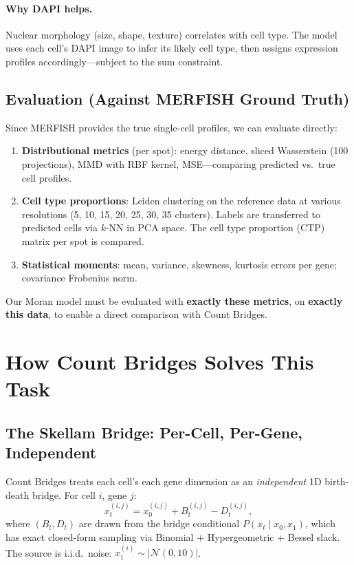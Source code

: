 \documentclass[11pt]{article}
\begin{document}
\paragraph{Why DAPI helps.} Nuclear morphology (size, shape, texture) correlates with cell type. The model uses each cell's DAPI image to infer its likely cell type, then assigns expression profiles accordingly---subject to the sum constraint.

\subsection{Evaluation (Against MERFISH Ground Truth)}

Since MERFISH provides the true single-cell profiles, we can evaluate directly:
\begin{enumerate}
  \item \textbf{Distributional metrics} (per spot): energy distance, sliced Wasserstein (100 projections), MMD with RBF kernel, MSE---comparing predicted vs.\ true cell profiles.
  \item \textbf{Cell type proportions}: Leiden clustering on the reference data at various resolutions (5, 10, 15, 20, 25, 30, 35 clusters). Labels are transferred to predicted cells via $k$-NN in PCA space. The cell type proportion (CTP) matrix per spot is compared.
  \item \textbf{Statistical moments}: mean, variance, skewness, kurtosis errors per gene; covariance Frobenius norm.
\end{enumerate}

Our Moran model must be evaluated with \textbf{exactly these metrics}, on \textbf{exactly this data}, to enable a direct comparison with Count Bridges.

\section{How Count Bridges Solves This Task}

\subsection{The Skellam Bridge: Per-Cell, Per-Gene, Independent}

Count Bridges treats each cell's each gene dimension as an \emph{independent} 1D birth-death bridge. For cell $i$, gene $j$:
\[
  x_t^{(i,j)} = x_0^{(i,j)} + B_t^{(i,j)} - D_t^{(i,j)},
\]
where $(B_t, D_t)$ are drawn from the bridge conditional $P(x_t \mid x_0, x_1)$, which has exact closed-form sampling via Binomial $+$ Hypergeometric $+$ Bessel slack. The source is i.i.d.\ noise: $x_1^{(i)} \sim |\mathcal{N}(0, 10)|$.
\end{document}
